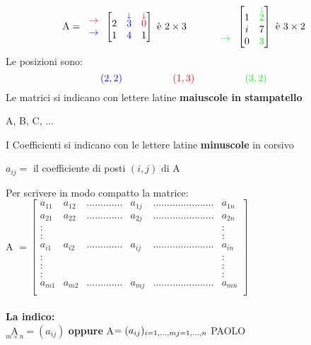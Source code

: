 $$
\textrm{A}= 
\begin{tabular}{c}
    {\color{red} $\rightarrow$}\\
    {\color{blue} $\rightarrow$}
\end{tabular}
\begin{bmatrix}
    2   &     \overset{\color{blue}\downarrow}{3} &  \overset{\color{red}\downarrow}{0}\\
    1   &   {\color{blue}4}                       &  1      
\end{bmatrix}\textrm{ è }2\times 3
\hspace{1cm}
\begin{tabular}{c}
    \\
    \\
    {\color{green}$\rightarrow$}
\end{tabular}
\begin{bmatrix}
    1   &   \overset{\color{green} \downarrow}{2}\\
    i   &   7\\
    0   &   {\color{green} 3}
\end{bmatrix}\textrm{ è } 3\times 2
$$
Le posizioni sono:
$$
{\color{blue}(2,2)}\hspace{1.8cm}
{\color{red}(1,3)}\hspace{1.8cm}
{\color{green}(3,2)}
$$
Le matrici si indicano con lettere latine \textbf{maiuscole in stampatello} 
\begin{center}
    A, B, C, ...
\end{center}
I Coefficienti si indicano con le lettere latine \textbf{minuscole} in corsivo
\begin{center}
    $a_{ij}=$ il coefficiente di posti $(i,j)$ di A
\end{center}
Per scrivere in modo compatto la matrice:\\

A
$=
\begin{bmatrix}
    a_{11} & a_{12} & ............. & a_{1j} & ...................... & a_{1n}\\
    a_{21} & a_{22} & ............. & a_{2j} & ...................... & a_{2n}\\
    : & & & & & :\\
    : & & & & & :\\
    a_{i1} & a_{i2} & ............. & a_{ij} & ...................... & a_{in}\\
    : & & & & & :\\
    : & & & & & :\\
    : & & & & & :\\
    a_{m1} & a_{m2} & ............. & a_{mj} & ...................... & a_{mn}\\
\end{bmatrix}
$\\\\
\textbf{La indico:}\\
$\underset{m\times n}{\textrm{A}}=(a_{ij})$ \textbf{oppure} A$=(a_{ij})_{i=1,...,m\\j=1,...,n}${\color{purple} PAOLO}%
